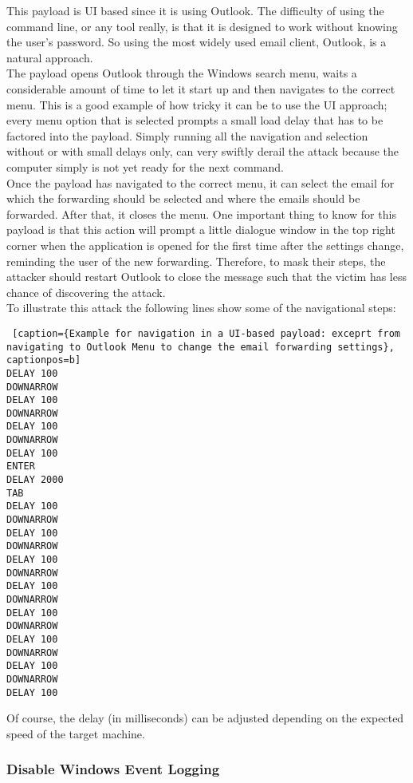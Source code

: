 This payload is UI based since it is using Outlook. The difficulty of using the command line, or any tool really, is that it is designed to work without knowing the user's password. So using the most widely used email client, Outlook, is a natural approach. \\
The payload opens Outlook through the Windows search menu, waits a considerable amount of time to let it start up and then navigates to the correct menu. This is a good example of how tricky it can be to use the UI approach; every menu option that is selected prompts a small load delay that has to be factored into the payload. Simply running all the navigation and selection without or with small delays only, can very swiftly derail the attack because the computer simply is not yet ready for the next command. \\
Once the payload has navigated to the correct menu, it can select the email for which the forwarding should be selected and where the emails should be forwarded. After that, it closes the menu. One important thing to know for this payload is that this action will prompt a little dialogue window in the top right corner when the application is opened for the first time after the settings change, reminding the user of the new forwarding. Therefore, to mask their steps, the attacker should restart Outlook to close the message such that the victim has less chance of discovering the attack. \\
To illustrate this attack the following lines show some of the navigational steps:


\begin{lstlisting} [caption={Example for navigation in a UI-based payload: exceprt from navigating to Outlook Menu to change the email forwarding settings}, captionpos=b]
DELAY 100
DOWNARROW
DELAY 100
DOWNARROW
DELAY 100
DOWNARROW
DELAY 100
ENTER
DELAY 2000
TAB
DELAY 100
DOWNARROW
DELAY 100
DOWNARROW
DELAY 100
DOWNARROW
DELAY 100
DOWNARROW
DELAY 100
DOWNARROW
DELAY 100
DOWNARROW
DELAY 100
DOWNARROW
DELAY 100
\end{lstlisting}

Of course, the delay (in milliseconds) can be adjusted depending on the expected speed of the target machine. 





\subsubsection{Disable Windows Event Logging}

